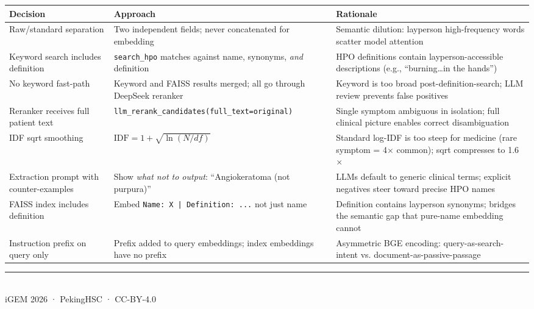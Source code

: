 \documentclass[11pt,a4paper]{article}
\begin{document}
\begin{table}[H]
\centering
\small
\begin{tabular}{@{}p{3.8cm}p{4.2cm}p{4.5cm}@{}}
\toprule
\textbf{Decision} & \textbf{Approach} & \textbf{Rationale} \\
\midrule
Raw/standard separation & Two independent fields; never concatenated for embedding & Semantic dilution: layperson high-frequency words scatter model attention \\
\midrule
Keyword search includes definition & \texttt{search\_hpo} matches against name, synonyms, \textit{and} definition & HPO definitions contain layperson-accessible descriptions (e.g., ``burning\ldots in the hands'') \\
\midrule
No keyword fast-path & Keyword and FAISS results merged; all go through DeepSeek reranker & Keyword is too broad post-definition-search; LLM review prevents false positives \\
\midrule
Reranker receives full patient text & \texttt{llm\_rerank\_candidates(full\_text=original)} & Single symptom ambiguous in isolation; full clinical picture enables correct disambiguation \\
\midrule
IDF sqrt smoothing & $\text{IDF} = 1 + \sqrt{\ln(N/df)}$ & Standard log-IDF is too steep for medicine (rare symptom = 4$\times$ common); sqrt compresses to 1.6$\times$ \\
\midrule
Extraction prompt with counter-examples & Show \textit{what not to output}: ``Angiokeratoma (not purpura)'' & LLMs default to generic clinical terms; explicit negatives steer toward precise HPO names \\
\midrule
FAISS index includes definition & Embed \texttt{Name: X | Definition: ...} not just name & Definition contains layperson synonyms; bridges the semantic gap that pure-name embedding cannot \\
\midrule
Instruction prefix on query only & Prefix added to query embeddings; index embeddings have no prefix & Asymmetric BGE encoding: query-as-search-intent vs. document-as-passive-passage \\
\bottomrule
\end{tabular}
\end{table}

\vspace{1cm}
\begin{center}
\rule{0.4\textwidth}{0.4pt}\\[0.5cm]
{\small iGEM 2026 · PekingHSC · CC-BY-4.0}
\end{center}
\end{document}
